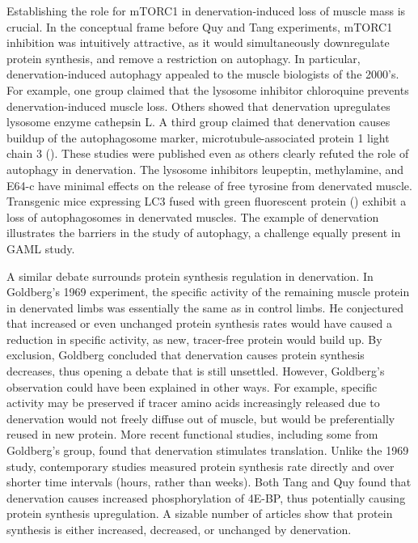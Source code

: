 \documentclass[12pt,english]{report}\usepackage[]{graphicx}\usepackage[]{color}
\begin{document}
Establishing the role for mTORC1 in denervation-induced loss of muscle
mass is crucial. In the conceptual frame before Quy and Tang experiments,
mTORC1 inhibition was intuitively attractive, as it would simultaneously
downregulate protein synthesis, and remove a restriction on autophagy.
In particular, denervation-induced autophagy appealed to the muscle
biologists of the 2000's. For example, one group claimed that the
lysosome inhibitor chloroquine prevents denervation-induced muscle
loss\citep{schwartz1990effects}. Others showed that denervation upregulates
lysosome enzyme cathepsin L\citep{mammucari2007foxo3}. A third group
claimed that denervation causes buildup of the autophagosome marker,
microtubule-associated protein 1 light chain 3 ()\citep{ju2010quantitation}.
These studies were published even as others clearly refuted the role
of autophagy in denervation. The lysosome inhibitors leupeptin, methylamine,
and E64-c have minimal effects on the release of free tyrosine from
denervated muscle\citep{furuno1990role}. Transgenic mice expressing
LC3 fused with green fluorescent protein ()
exhibit a loss of autophagosomes in denervated muscles\citep{quy2013proteasome-dependent}.
The example of denervation illustrates the barriers in the study of
autophagy, a challenge equally present in GAML study.

A similar debate surrounds protein synthesis regulation in denervation.
In Goldberg's 1969 experiment, the specific activity of the remaining
muscle protein in denervated limbs was essentially the same as in
control limbs. He conjectured that increased or even unchanged protein
synthesis rates would have caused a reduction in specific activity,
as new, tracer-free protein would build up. By exclusion, Goldberg
concluded that denervation causes protein synthesis decreases, thus
opening a debate that is still unsettled. However, Goldberg's observation
could have been explained in other ways. For example, specific activity
may be preserved if tracer amino acids increasingly released due to
denervation would not freely diffuse out of muscle, but would be preferentially
reused in new protein. More recent functional studies, including some
from Goldberg's group, found that denervation stimulates translation\citep{goncalves2012clenbuterol,quy2013proteasome-dependent,gomes2012upregulation,joshi2014differential,furuno1990role}.
Unlike the 1969 study, contemporary studies measured protein synthesis
rate directly and over shorter time intervals (hours, rather than
weeks). Both Tang and Quy found that denervation causes increased
phosphorylation of 4E-BP, thus potentially causing protein synthesis
upregulation. A sizable number of articles show that protein synthesis
is either increased, decreased, or unchanged by denervation.
\end{document}

